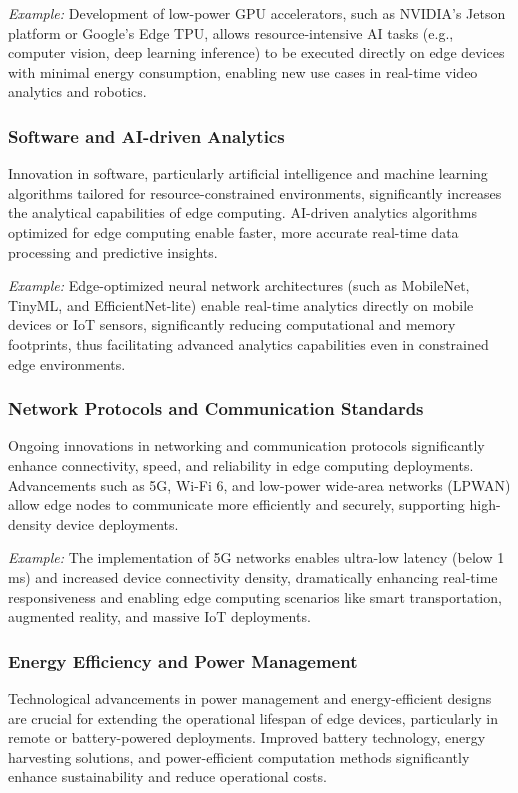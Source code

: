 \documentclass[runningheads]{llncs}
\begin{document}
\textit{Example:} Development of low-power GPU accelerators, such as NVIDIA's Jetson platform or Google's Edge TPU, allows resource-intensive AI tasks (e.g., computer vision, deep learning inference) to be executed directly on edge devices with minimal energy consumption, enabling new use cases in real-time video analytics and robotics.

\subsubsection{Software and AI-driven Analytics}
Innovation in software, particularly artificial intelligence and machine learning algorithms tailored for resource-constrained environments, significantly increases the analytical capabilities of edge computing. AI-driven analytics algorithms optimized for edge computing enable faster, more accurate real-time data processing and predictive insights.

\textit{Example:} Edge-optimized neural network architectures (such as MobileNet, TinyML, and EfficientNet-lite) enable real-time analytics directly on mobile devices or IoT sensors, significantly reducing computational and memory footprints, thus facilitating advanced analytics capabilities even in constrained edge environments.

\subsubsection{Network Protocols and Communication Standards}
Ongoing innovations in networking and communication protocols significantly enhance connectivity, speed, and reliability in edge computing deployments. Advancements such as 5G, Wi-Fi 6, and low-power wide-area networks (LPWAN) allow edge nodes to communicate more efficiently and securely, supporting high-density device deployments.

\textit{Example:} The implementation of 5G networks enables ultra-low latency (below 1 ms) and increased device connectivity density, dramatically enhancing real-time responsiveness and enabling edge computing scenarios like smart transportation, augmented reality, and massive IoT deployments.

\subsubsection{Energy Efficiency and Power Management}
Technological advancements in power management and energy-efficient designs are crucial for extending the operational lifespan of edge devices, particularly in remote or battery-powered deployments. Improved battery technology, energy harvesting solutions, and power-efficient computation methods significantly enhance sustainability and reduce operational costs.
\end{document}
